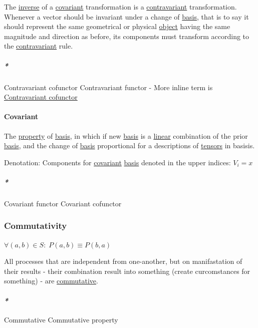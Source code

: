 \documentclass[a4paper,14pt,oneside]{book}
\begin{document}
The \hyperref[orgc71f837]{inverse} of a \hyperref[org0d7847b]{covariant} transformation is a \hyperref[orgc9b46c4]{contravariant} transformation. Whenever a vector should be invariant under a change of \hyperref[orgb1ea5cb]{basis}, that is to say it should represent the same geometrical or physical \hyperref[org721eb0d]{object} having the same magnitude and direction as before, its components must transform according to the \hyperref[orgc9b46c4]{contravariant} rule.

\subparagraph{\emph{*}}
\label{sec:org6fa2bd6}

\label{org7ce30d1}Contravariant cofunctor
\label{orge8e1fdf}Contravariant functor - More inline term is \hyperref[org7ce30d1]{Contravariant cofunctor}

\paragraph{\label{org0d7847b}Covariant}
\label{sec:org5009528}
The \hyperref[org638ba9c]{property} of \hyperref[orgb1ea5cb]{basis}, in which if new \hyperref[orgb1ea5cb]{basis} is a \hyperref[orge56c9c3]{linear} combination of the prior \hyperref[orgb1ea5cb]{basis}, and the change of \hyperref[orgb1ea5cb]{basis} proportional for a descriptions of \hyperref[org5dc4a17]{tensors} in basisis.

Denotation:
Components for \hyperref[org0d7847b]{covariant} \hyperref[orgb1ea5cb]{basis} denoted in the upper indices:
\(V_{i} = x\)

\subparagraph{\emph{*}}
\label{sec:org5d2de86}

\label{orge7ea7c7}Covariant functor
\label{org320045a}Covariant cofunctor

\subsubsection{\label{org5333714}Commutativity}
\label{sec:orgd95b454}
\(\forall (a,b) \in S : \; P(a,b) \equiv P(b,a)\)

All processes that are independent from one-another, but on manifastation of their results - their combination result into something (create curcomstances for something) - are \hyperref[org5c061f7]{commutative}.

\paragraph{\emph{*}}
\label{sec:org38d716f}

\label{org5c061f7}Commutative
\label{org4214d09}Commutative property
\end{document}
